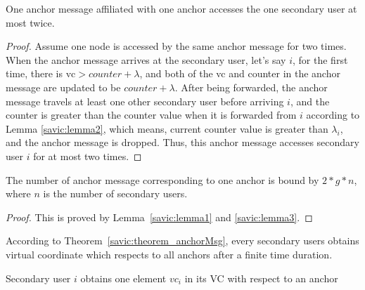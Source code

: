 \begin{lemma}
\label{savic:lemma3}
One anchor message affiliated with one anchor accesses the one secondary user at most twice.
\end{lemma}
\begin{proof}
Assume one node is accessed by the same anchor message for two times.
When the anchor message arrives at the secondary user, let's say $i$, for the first time, there is $\text{vc} > counter+\lambda$, and both of the vc and counter in the anchor message are updated to be $counter+\lambda$.
After being forwarded, the anchor message travels at least one other secondary user before arriving $i$, and the counter is greater than the counter value when it is forwarded from $i$ according to Lemma \ref{savic:lemma2}, which means, current counter value is greater than $\lambda_i$, and the anchor message is dropped.
Thus, this anchor message accesses secondary user $i$ for at most two times.
\end{proof}

\begin{theorem}
\label{savic:theorem_anchorMsg}
The number of anchor message corresponding to one anchor is bound by $2*g*n$, where $n$ is the number of secondary users.
\end{theorem}
\begin{proof}
This is proved by Lemma~\ref{savic:lemma1} and \ref{savic:lemma3}.
\end{proof}

According to Theorem~\ref{savic:theorem_anchorMsg}, every secondary users obtains virtual coordinate which respects to all anchors after a finite time duration.
\begin{algorithm}[!h]
\caption{Secondary user $i$ obtains one element $vc_i$ in its VC with respect to an anchor}%
\label{algo:receiveAnchorMessage} 
\DontPrintSemicolon
\SetAlgoLined
{}

\end{algorithm}


